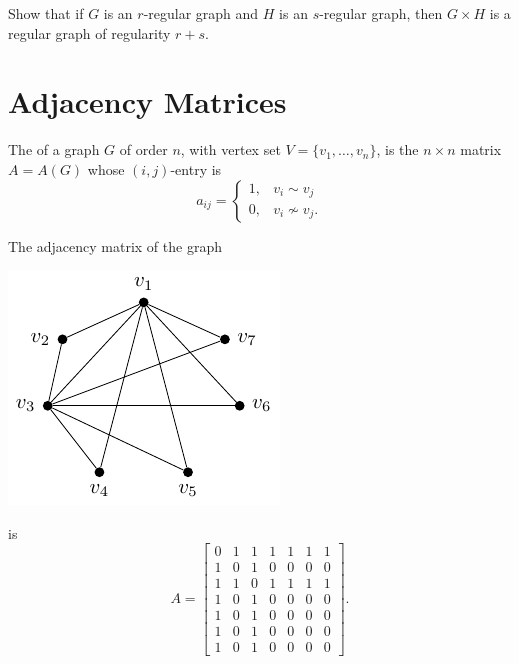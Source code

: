 \begin{Exercise}
	Show that if $G$ is an $r$-regular graph and $H$ is an $s$-regular graph, then $G \times H$ is a regular graph of regularity $r + s$.
\end{Exercise}


\section{Adjacency Matrices}\label{sec:AdjMat}

The  of a graph $G$ of order $n$, with vertex set $V = \{v_1, \ldots, v_n\}$, is the $n \times n$ matrix $A = A(G)$ whose $(i,j)$-entry is
\begin{equation*}
a_{ij} = \begin{cases}
1, & v_i \sim v_j \\
0, & v_i \nsim v_j.
\end{cases}
\end{equation*}

\begin{Example}\label{ex:GNM(6-11)AdjMat}
The adjacency matrix of the graph
\begin{center}
\includegraphics{Images/GNM(6,11).pdf}
\end{center}
is
\begin{equation*}
A = \begin{bmatrix}
0 & 1 & 1 & 1 & 1 & 1 & 1 \\
1 & 0 & 1 & 0 & 0 & 0 & 0 \\
1 & 1 & 0 & 1 & 1 & 1 & 1 \\
1 & 0 & 1 & 0 & 0 & 0 & 0 \\
1 & 0 & 1 & 0 & 0 & 0 & 0 \\
1 & 0 & 1 & 0 & 0 & 0 & 0 \\
1 & 0 & 1 & 0 & 0 & 0 & 0
\end{bmatrix}.
\end{equation*}
\end{Example}

